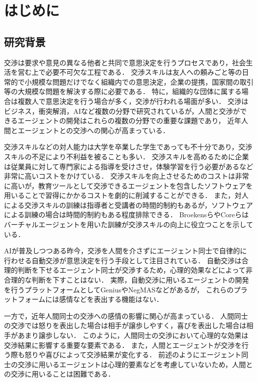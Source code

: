

\chapter{はじめに}
\section{研究背景}
\label{sec:introduction}
交渉は要求や意見の異なる他者と共同で意思決定を行うプロセスであり，社会生活を営む上で必要不可欠な工程である．
交渉スキルは友人への頼みごと等の日常的で小規模な問題だけでなく組織内での意思決定，企業の提携，国家間の取引等の大規模な問題を解決する際に必要である．
特に，組織的な団体に属する場合は複数人で意思決定を行う場合が多く，交渉が行われる場面が多い\cite{negSurvey}．
交渉はビジネス，衝突解消，AIなど複数の分野で研究されているが，人間と交渉ができるエージェントの開発はこれらの複数の分野での重要な課題であり，
近年人間とエージェントとの交渉への関心が高まっている\cite{han-challenge}．

交渉スキルなどの対人能力は大学を卒業した学生であっても不十分であり\cite{graduate}，交渉スキルの不足により不利益を被ることも多い．
交渉スキルを高めるために企業は従業員に対して専門家による指導を受けさせ，体験学習を行う必要があるなど非常に高いコストをかけている\cite{nego-teach}．
交渉スキルを向上させるためのコストは非常に高いが，教育ツールとして交渉できるエージェントを包含したソフトウェアを用いることで習得にかかるコストを劇的に削減することができる．
また，対人による交渉スキルの訓練は指導者と受講者の時間的制約もあるが，ソフトウェアによる訓練の場合は時間的制約もある程度排除できる．
Broekensら\cite{vr-training}やCoreら\cite{vr-simulation}はバーチャルエージェントを用いた訓練が交渉スキルの向上に役立つことを示している．

AIが普及しつつある昨今，交渉を人間を介さずにエージェント同士で自律的に行わせる自動交渉が意思決定を行う手段として注目されている\cite{automated-negotiation}．
自動交渉は合理的判断を下せるエージェント同士が交渉するため，心理的効果などによって非合理的な判断を下すことはない．
実際，自動交渉に用いるエージェントの開発を行うプラットフォームとしてGenius\cite{genius}やNegMAS\cite{negmas}などがあるが，
これらのプラットフォームには感情などを表出する機能はない．

一方で，近年人間同士の交渉への感情の影響に関心が高まっている\cite{emotion-effect}．
人間同士の交渉では怒りを表出した場合は相手が譲歩しやすく，喜びを表出した場合は相手があまり譲歩しない\cite{emotion-hh}．
このように，人間同士の交渉において心理的な効果は交渉結果に影響する重要な要素である．
また，人間とエージェントが交渉を行う際も怒りや喜びによって交渉結果が変化する\cite{emotion-ha}．
前述のようにエージェント同士の交渉に用いるエージェントは心理的要素などを考慮していないため，人間との交渉に用いることは困難である\cite{pinocchio}．

